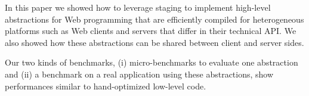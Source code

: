 \documentclass[preprint]{sigplanconf}
\begin{document}
In this paper we showed how to leverage staging to implement high-level abstractions for Web
programming that are efficiently compiled for heterogeneous platforms such as Web clients and
servers that differ in their technical API. We also showed how these abstractions can be shared
between client and server sides. 

Our two kinds of benchmarks, (i) micro-benchmarks to evaluate one abstraction and (ii) a benchmark
on a real application using these abstractions, show performances similar to hand-optimized
low-level code.



%
%
%



%
%
%
\end{document}
